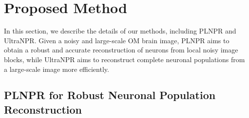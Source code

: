 \section{Proposed Method}
\label{sec:method}

In this section, we describe the details of our methods, including PLNPR and UltraNPR. Given a noisy and large-scale OM brain image, PLNPR aims to obtain a robust and accurate reconstruction of neurons from local noisy image blocks, while UltraNPR aims to reconstruct complete neuronal populations from a large-scale image more efficiently.


\subsection{PLNPR for Robust Neuronal Population Reconstruction}
\label{sec:PLNPR}

